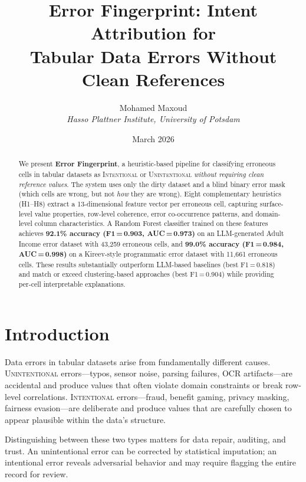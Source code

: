 \documentclass[11pt,a4paper]{article}
\title{%
  \textbf{Error Fingerprint: Intent Attribution for\\
  Tabular Data Errors Without Clean References}
}
\author{
  Mohamed Maxoud \\
  \textit{Hasso Plattner Institute, University of Potsdam}
}
\date{March 2026}
\newcommand{\intentional}{\textsc{Intentional}}
\newcommand{\unintentional}{\textsc{Unintentional}}
\begin{document}
\maketitle

\begin{abstract}
We present \textbf{Error Fingerprint}, a heuristic-based pipeline for
classifying erroneous cells in tabular datasets as \intentional{} or
\unintentional{} \emph{without requiring clean reference values}. The system
uses only the dirty dataset and a blind binary error mask (which cells are
wrong, but not \emph{how} they are wrong).  Eight complementary heuristics
(H1--H8) extract a 13-dimensional feature vector per erroneous cell, capturing
surface-level value properties, row-level coherence, error co-occurrence
patterns, and domain-level column characteristics.  A Random Forest classifier
trained on these features achieves \textbf{92.1\% accuracy (F1\,=\,0.903,
AUC\,=\,0.973)} on an LLM-generated Adult Income error dataset with 43{,}259
erroneous cells, and \textbf{99.0\% accuracy (F1\,=\,0.984,
AUC\,=\,0.998)} on a Kireev-style programmatic error dataset with 11{,}661
erroneous cells.  These results substantially outperform LLM-based baselines
(best F1\,=\,0.818) and match or exceed clustering-based approaches
(best F1\,=\,0.904) while providing per-cell interpretable explanations.
\end{abstract}

\section{Introduction}
\label{sec:intro}

Data errors in tabular datasets arise from fundamentally different causes.
\unintentional{} errors---typos, sensor noise, parsing failures, OCR
artifacts---are accidental and produce values that often violate domain
constraints or break row-level correlations.  \intentional{} errors---fraud,
benefit gaming, privacy masking, fairness evasion---are deliberate and
produce values that are carefully chosen to appear plausible within the
data's structure.

Distinguishing between these two types matters for data repair, auditing, and
trust.  An unintentional error can be corrected by statistical imputation; an
intentional error reveals adversarial behavior and may require flagging the
entire record for review.
\end{document}
